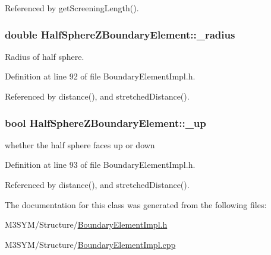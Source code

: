 Referenced by get\+Screening\+Length().

\hypertarget{classHalfSphereZBoundaryElement_ad1fff310ac2c3f221a8ab7393dc23b69}{
\subsubsection[{\+\_\+radius}]{\setlength{\rightskip}{0pt plus 5cm}double Half\+Sphere\+Z\+Boundary\+Element\+::\+\_\+radius\hspace{0.3cm}{\ttfamily [private]}}}\label{classHalfSphereZBoundaryElement_ad1fff310ac2c3f221a8ab7393dc23b69}


Radius of half sphere. 



Definition at line 92 of file Boundary\+Element\+Impl.\+h.



Referenced by distance(), and stretched\+Distance().

\hypertarget{classHalfSphereZBoundaryElement_a3251d9e34c161076f9324dc3f2477720}{
\subsubsection[{\+\_\+up}]{\setlength{\rightskip}{0pt plus 5cm}bool Half\+Sphere\+Z\+Boundary\+Element\+::\+\_\+up\hspace{0.3cm}{\ttfamily [private]}}}\label{classHalfSphereZBoundaryElement_a3251d9e34c161076f9324dc3f2477720}


whether the half sphere faces up or down 



Definition at line 93 of file Boundary\+Element\+Impl.\+h.



Referenced by distance(), and stretched\+Distance().



The documentation for this class was generated from the following files\+:\begin{DoxyCompactItemize}
\item 
M3\+S\+Y\+M/\+Structure/\hyperlink{BoundaryElementImpl_8h}{Boundary\+Element\+Impl.\+h}\item 
M3\+S\+Y\+M/\+Structure/\hyperlink{BoundaryElementImpl_8cpp}{Boundary\+Element\+Impl.\+cpp}\end{DoxyCompactItemize}
